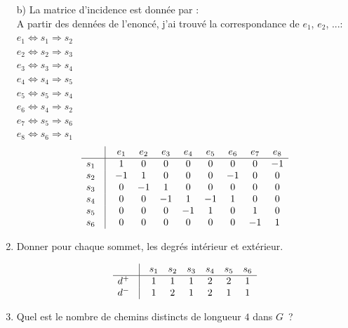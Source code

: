 \begin{enumerate}[\rm 1)]
\begin{framed}
b) La matrice d'incidence est donn\'ee par : \\
A partir des dennées de l'enoncé, j'ai trouvé la correspondance de $e_1$, $e_2$, ...:\\
$e_1 \Longleftrightarrow s_1 \Longrightarrow s_2$\\
$e_2 \Longleftrightarrow s_2 \Longrightarrow s_3$\\
$e_3 \Longleftrightarrow s_3 \Longrightarrow s_4$\\
$e_4 \Longleftrightarrow s_4 \Longrightarrow s_5$\\
$e_5 \Longleftrightarrow s_5 \Longrightarrow s_4$\\
$e_6 \Longleftrightarrow s_4 \Longrightarrow s_2$\\
$e_7 \Longleftrightarrow s_5 \Longrightarrow s_6$\\
$e_8 \Longleftrightarrow s_6 \Longrightarrow s_1$
\setcounter{MaxMatrixCols}{20}
\[
\begin{matrix}
 &\vline&e_1 &e_2 &e_3 &e_4 &e_5&e_6&e_7 &e_8 \\
\hline
s_1&\vline&1&0&0    &0  &0 & 0&0&-1  \\
s_2&\vline&-1&1&0    &0  &0 & -1&0&0  \\
s_3&\vline&0&-1&1    &0  &0 & 0&0&0  \\
s_4&\vline&0&0&-1    &1  &-1 & 1&0&0  \\
s_5&\vline&0&0&0    &-1  &1 & 0&1&0  \\
s_6&\vline&0&0&0    &0  &0 & 0&-1&1  \\
\end{matrix}
\]



\end{framed}

\item{}  Donner pour chaque sommet, les degr\'es intérieur et extérieur.
\begin{framed}

\[
\begin{matrix}
 &\vline&s_1 &s_2 &s_3 &s_4 &s_5&s_6\\
\hline
d^+&\vline&1 &1 &1&2 &2& 1\\
d^-&\vline&1 &2 &1&2 &1& 1\\
\end{matrix}
\]

\end{framed}
\item{}  Quel est le nombre de chemins distincts de longueur $4$ dans $G$~? 
\begin{framed}


\end{framed}
\end{enumerate}
